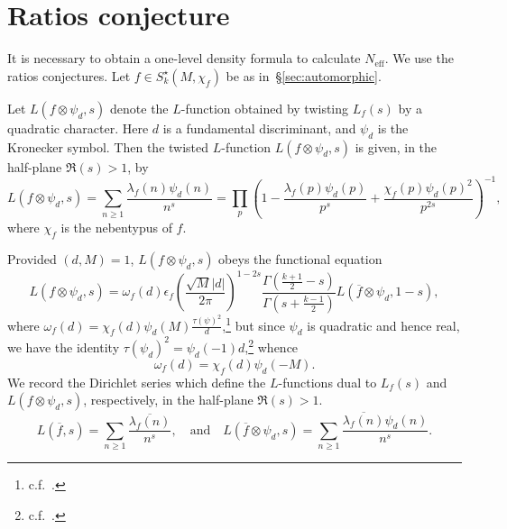 \documentclass[11pt,reqno]{amsart} \usepackage{fullpage}
\renewcommand{\geq}{\geqslant}
\newcommand\be{\begin{equation}}
\newcommand\ee{\end{equation}}
\newcommand{\neff}{N_{\text{eff}}}
\numberwithin{equation}{section}
\begin{document}
\section{Ratios conjecture}
It is necessary to obtain a one-level density formula to calculate $\neff$.
We use the ratios conjectures. Let $f\in S_k^\star(M,\chi_f)$ be as
in~\S\ref{sec:automorphic}.

Let $L(f\otimes\psi_d,s)$ denote the $L$-function obtained by twisting $L_f(s)$
by a quadratic character. Here $d$ is a fundamental discriminant, and $\psi_d$
is the Kronecker symbol. Then the twisted $L$-function $L(f\otimes\psi_d,s)$ is given, in
the half-plane $\Re(s)>1$, by
\be\label{eq:deftwistedLfun}
L(f\otimes\psi_d,s) = \sum_{n\geq1}\frac{\lambda_f(n)\psi_d(n)}{n^s}
=
\prod_p\left(1-\frac{\lambda_f(p)\psi_d(p)}{p^s}+
  \frac{\chi_f(p)\psi_d(p)^2}{p^{2s}}\right)^{-1},
\ee
where $\chi_f$ is the nebentypus of $f$.

Provided $(d,M)=1$, $L(f\otimes\psi_d,s)$ obeys the functional equation
\be\label{eq:twistedfuneq}
L(f\otimes\psi_d,s)
=\omega_f(d)\epsilon_f
\left(\frac{\sqrt M|d|}{2\pi}\right)^{1-2s}
\frac{\Gamma\left(\frac{k+1}2-s\right)}{\Gamma\left(s+\frac{k-1}2\right)}
L(\overline f\otimes\psi_d,1-s),\ee
where $\omega_f(d) = \chi_f(d)\psi_d(M)\frac{\tau(\psi)^2}{d}$,\footnote{c.f.~\cite[p.377]{IK}.}
but since $\psi_d$ is quadratic and hence real, we have the identity
$\tau(\psi_d)^2=\psi_d(-1)d$,\footnote{c.f.~\cite[Theorem 2.1.47]{cohenNT}.}
whence \be\omega_f(d) = \chi_f(d)\psi_d(-M).\ee
We record the Dirichlet series which define the $L$-functions dual to $L_f(s)$
and $L(f\otimes\psi_d,s)$, respectively, in the half-plane $\Re(s)>1$.
\be L(\overline f,s)=\sum_{n\geq1}\frac{\overline{\lambda_f(n)}}{n^s}, \quad\text{and}\quad
L(\overline f\otimes\psi_d,s)=\sum_{n\geq1}\frac{\overline{\lambda_f(n)}\psi_d(n)}{n^{s}}.
\ee
\end{document}
